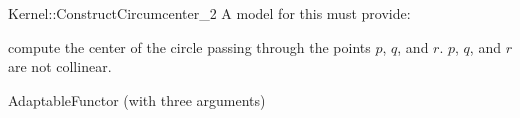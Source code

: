 \begin{ccRefFunctionObjectConcept}{Kernel::ConstructCircumcenter_2}
A model for this must provide:


 {compute the center of the circle passing through the points $p$, $q$, and $r$.
  \ccPrecond $p$, $q$, and $r$ are not collinear.}

\ccRefines
AdaptableFunctor (with three arguments)

\ccSeeAlso
{} \\

\end{ccRefFunctionObjectConcept}
